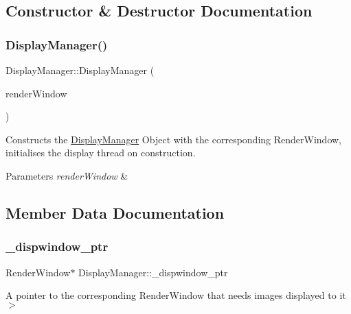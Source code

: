 \subsection{Constructor \& Destructor Documentation}
\mbox{\label{class_display_manager_a5cae0a0f81cbd2457eca8d35733a0516}} 
\subsubsection{\texorpdfstring{Display\+Manager()}{DisplayManager()}}
{\footnotesize\ttfamily Display\+Manager\+::\+Display\+Manager (\begin{DoxyParamCaption}\item[{Render\+Window \&}]{render\+Window }\end{DoxyParamCaption})}



Constructs the \hyperlink{class_display_manager}{Display\+Manager} Object with the corresponding Render\+Window, initialises the display thread on construction. 


\begin{DoxyParams}{Parameters}
{\em render\+Window} & \\
\hline
\end{DoxyParams}


\subsection{Member Data Documentation}
\mbox{\label{class_display_manager_abe0369d0fa6b544c77d9d50d50f949cf}} 
\subsubsection{\texorpdfstring{\+\_\+dispwindow\+\_\+ptr}{\_dispwindow\_ptr}}
{\footnotesize\ttfamily Render\+Window$\ast$ Display\+Manager\+::\+\_\+dispwindow\+\_\+ptr\hspace{0.3cm}{\ttfamily [private]}}

A pointer to the corresponding Render\+Window that needs images displayed to it$>$ \mbox{\label{class_display_manager_aee260bf088ffc55e21bd1ef282a139db}} 
